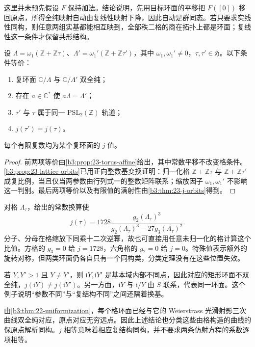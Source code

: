 这里并未预先假设 \(F\) 保持加法。结论说明，先用目标环面的平移把 \(F([0])\) 移回原点，所得全纯映射自动由复线性映射下降，因此自动是群同态。若只要求实线性同构，则任意两组实基都能相互映到，全部秩二格的商在拓扑上都是环面；复线性这一条件才保留共形结构。

\begin{theorem}[复环面的模参数分类]\label{b3:thm:23-torus-j-classification}
设 \(\Lambda=\omega_1(\mathbb Z+\mathbb Z\tau)\)、\(\Lambda'=\omega_1'(\mathbb Z+\mathbb Z\tau')\)，其中 \(\omega_1,\omega_1'\ne0\)，\(\tau,\tau'\in\mathfrak H\)。以下条件等价：
\begin{enumerate}
\item 复环面 \(\mathbb C/\Lambda\) 与 \(\mathbb C/\Lambda'\) 双全纯；
\item 存在 \(a\in\mathbb C^*\) 使 \(a\Lambda=\Lambda'\)；
\item \(\tau'\) 与 \(\tau\) 属于同一 \(\mathrm{PSL}_2(\mathbb Z)\) 轨道；
\item \(j(\tau')=j(\tau)\)。
\end{enumerate}
每个有限复数均为某个复环面的 \(j\) 值。
\end{theorem}
\begin{proof}
前两项等价由\cref{b3:prop:23-torus-affine}给出，其中常数平移不改变格条件。\cref{b3:prop:23-lattice-orbits}已用正向整数基变换证明：归一化格 \(\mathbb Z+\mathbb Z\tau\) 与 \(\mathbb Z+\mathbb Z\tau'\) 成复比例，当且仅当两参数由行列式一的整数矩阵联系；缩放因子 \(\omega_1,\omega_1'\) 不影响这一判别。最后两项等价以及有限值的满射性由\cref{b3:thm:23-j-orbits}得到。
\end{proof}

\ProseParagraphBreak
对格 \(\Lambda_\tau\)，给出的常数换算使
\[
 j(\tau)=1728\frac{g_2(\Lambda_\tau)^3}
 {g_2(\Lambda_\tau)^3-27g_3(\Lambda_\tau)^2}.
\]
分子、分母在格缩放下同乘十二次逆幂，故也可直接用任意未归一化的格计算这个比值。方格的 \(g_3=0\) 给 \(j=1728\)，六角格的 \(g_2=0\) 给 \(j=0\)。特殊值表示额外的旋转对称，但两类环面仍各自只有一个同构类，分类定理没有在这些位置失效。

\ProseParagraphBreak
若 \(Y,Y'>1\) 且 \(Y\ne Y'\)，则 \(\mathrm iY,\mathrm iY'\) 是基本域内部不同点，因此对应的矩形环面不双全纯，\(j(\mathrm iY)\ne j(\mathrm iY')\)。另一方面，\(\mathrm iY\) 与 \(\mathrm i/Y\) 由 \(S\) 联系，代表同一环面。这个例子说明“参数不同”与“复结构不同”之间还隔着换基。

\ProseParagraphBreak
由\cref{b3:thm:22-uniformization}，每个格环面已经与它的 Weierstrass 光滑射影三次曲线双全纯对应，原点对应无穷远点。因此上述结论也分类这些由格构造的曲线的保原点解析同构。\(j\) 相等意味着相应复结构同构，并不要求两条仿射方程的系数逐项相等。

